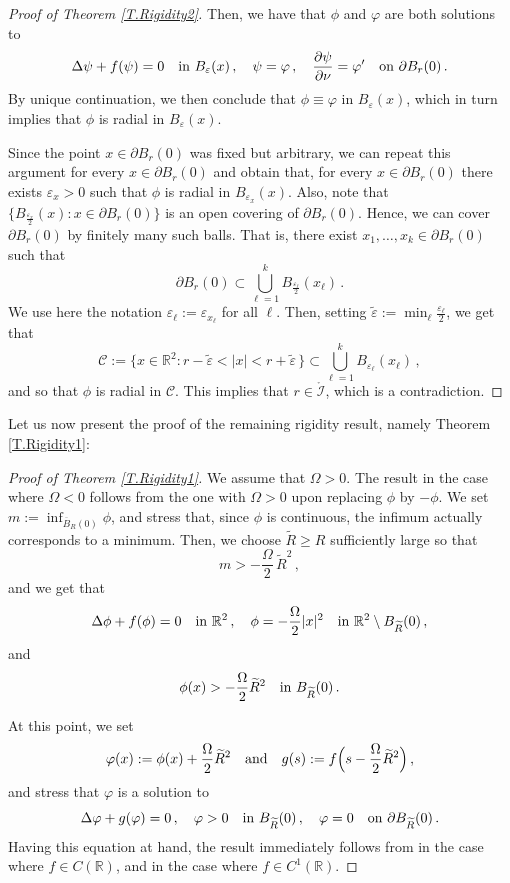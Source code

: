 \documentclass[11pt,oneside]{amsart}
\theoremstyle{definition}
\newcommand{\ep}{\varepsilon}
\newcommand{\vp}{\varphi}
\newcommand{\Om}{\Omega}
\def\RR{\mathbb{R}}
\newcommand{\cB}{{\mathcal I}}
\newcommand{\cC}{{\mathcal C}}
\newcommand{\pd}{\partial}
\renewcommand\geq\geqslant
\numberwithin{equation}{section}
\begin{document}
\begin{proof}[Proof of Theorem \ref{T.Rigidity2}]
    
    Then, we have that $\phi$ and $\vp$ are both solutions to 
    $$
    \Delta \psi + f(\psi) = 0 \quad \textup{in } B_\ep(x)\,, \quad \psi = \vp \,, \quad \frac{\pd \psi}{\pd \nu} = \vp' \quad \textup{on } \pd B_r(0)\,.
    $$
    By unique continuation, we then conclude that $\phi \equiv \vp$ in $B_\ep(x)$, which in turn implies that $\phi$ is radial in $B_\ep(x)$. 

    Since the point $x \in \pd B_r(0)$ was fixed but arbitrary, we can repeat this argument for every $x \in \pd B_r(0)$ and obtain that, for every $x \in \pd B_r(0)$ there exists $\ep_x > 0$ such that $\phi$ is radial in $B_{\ep_x}(x)$. Also, note that $\{B_{\frac{\ep_x}{2}}(x): x \in \pd B_r(0)\}$ is an open covering of $\pd B_r(0)$. Hence, we can cover $\pd B_r(0)$ by finitely many such balls. That is, there exist $x_1, \ldots, x_k \in \pd B_r(0)$ such that
    $$
    \pd B_r(0) \subset \bigcup_{\ell=1}^k B_{\frac{\ep_{\ell}}{2}}(x_\ell)\,.
    $$
    We use here the notation $\ep_\ell := \ep_{x_\ell}$ for all $\ell$. Then, setting $\widetilde{\ep} := \min_{\ell} \tfrac{\ep_\ell}{2}$, we get that
    $$
    \cC:= \{x \in \RR^2: r-\widetilde{\ep} < |x| < r+ \widetilde{\ep}\, \} \subset \bigcup_{\ell=1}^k B_{\ep_\ell}(x_\ell)\,,
    $$
    and so that $\phi$ is radial in $\cC$. This implies that $r \in \mathring{\cB}$, which is a contradiction.  
\end{proof}

Let us now present the proof of the remaining rigidity result, namely Theorem \ref{T.Rigidity1}:

\begin{proof}[Proof of Theorem \ref{T.Rigidity1}]
    We assume that $\Om > 0$. The result in the case where $\Om < 0$ follows from the one with $\Om > 0$ upon replacing $\phi$ by $-\phi$.  We set $m := \inf_{\overline{B}_R(0)} \phi$, and stress that, since $\phi$ is continuous, the infimum actually corresponds to a minimum. Then, we choose $\widetilde{R} \geq R$ sufficiently large so that
    $$
    m > - \frac{\Om}{2}\,\widetilde{R}^{2}\,,
    $$
    and we get that
     $$
     \Delta \phi + f(\phi ) = 0 \quad \textup{in } \RR^2\,, \quad \phi = - \frac{\Om}{2}|x|^2 \quad \textup{in } \RR^2 \setminus B_{\widetilde{R}}(0)\,, $$
     and
     $$
     \phi(x) > - \frac{\Om}{2} \widetilde{R}^{2} \quad \textup{in } B_{\widetilde{R}}(0)\,.
     $$
     
     At this point, we set
     $$
     \varphi(x) := \phi(x) + \frac{\Om}{2} \widetilde{R}^{2}\quad \textup{and} \quad g(s):= f\Big(s- \frac{\Om}{2} \widetilde{R}^{2}\Big)\,,
     $$
     and stress that $\varphi$ is a solution to
     \begin{equation*} 
     \Delta \varphi + g(\varphi) = 0\,, \quad \varphi > 0 \quad \textup{in } B_{\widetilde{R}}(0)\,, \quad \varphi = 0 \quad \textup{on } \pd B_{\widetilde{R}}(0)\,.
     \end{equation*}
     Having this equation at hand, the result immediately follows from  \cite[Theorem 7.2 and Corollary 7.6]{Brock} in the case where $f \in C(\RR)$, and \cite[Theorem 1]{GNN} in the case where $f \in C^1(\RR)$.
\end{proof}
\end{document}
